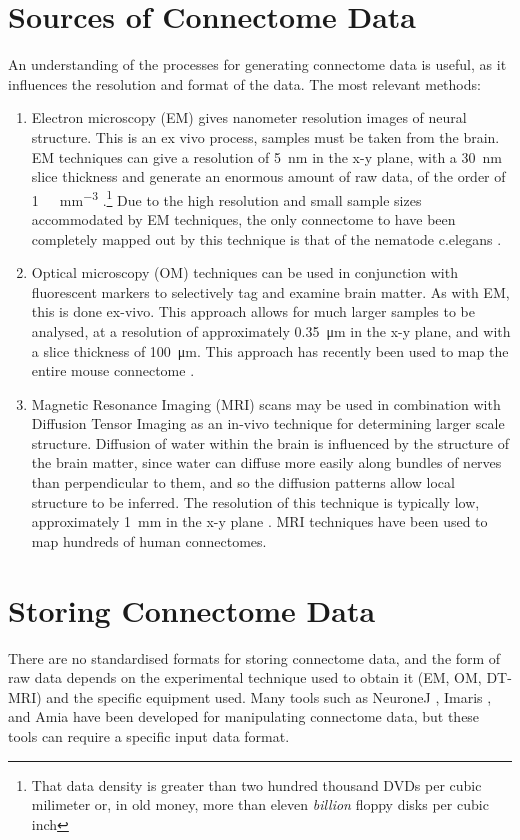 \documentclass[MSc,paper=a4,pagesize=auto]{icldt}
\begin{document}
\section{Sources of Connectome Data}
An understanding of the processes for generating connectome data is useful, as it influences the resolution and format of the data. The most relevant methods:
\begin{enumerate}
\item Electron microscopy (EM) gives nanometer resolution images of neural structure. This is an ex vivo process, samples must be taken from the brain. EM techniques can give a resolution of \SI{5}{\nm} in the x-y plane, with a \SI{30}{\nm} slice thickness and generate an enormous amount of raw data, of the order of \SI{1}{\pebi\byte\per\mm\cubed} \cite{Jeong2010}.\footnote{That data density is greater than two hundred thousand DVDs per cubic milimeter or, in old money, more than eleven \textit{billion} floppy disks per cubic inch} Due to the high resolution and small sample sizes accommodated by EM techniques, the only connectome to have been completely mapped out by this technique is that of the nematode c.elegans \cite{White1986}.
\item Optical microscopy (OM) techniques can be used in conjunction with fluorescent markers to selectively tag and examine brain matter. As with EM, this is done ex-vivo. This approach allows for much larger samples to be analysed, at a resolution of approximately \SI{0.35}{\um} in the x-y plane, and with a slice thickness of \SI{100}{\um}. This approach has recently been used to map the entire mouse connectome \cite{Oh2014}. 
\item Magnetic Resonance Imaging (MRI) scans may be used in combination with Diffusion Tensor Imaging as an in-vivo technique for determining larger scale structure. Diffusion of water within the brain is influenced by the structure of the brain matter, since water can diffuse more easily along bundles of nerves than perpendicular to them, and so the diffusion patterns allow local structure to be inferred. The resolution of this technique is typically low, approximately \SI{1}{\mm} in the x-y plane \cite{Westin2002}. MRI techniques have been used to map hundreds of human connectomes. 
\end{enumerate}

\section{Storing Connectome Data}
There are no standardised formats for storing connectome data, and the form of raw data depends on the experimental technique used to obtain it (EM, OM, DT-MRI) and the specific equipment used. Many tools such as NeuroneJ \cite{NeuronJ2014}, Imaris \cite{Imaris2014}, and Amia \cite{Amira2014} have been developed for manipulating connectome data, but these tools can require a specific input data format. 
\end{document}
